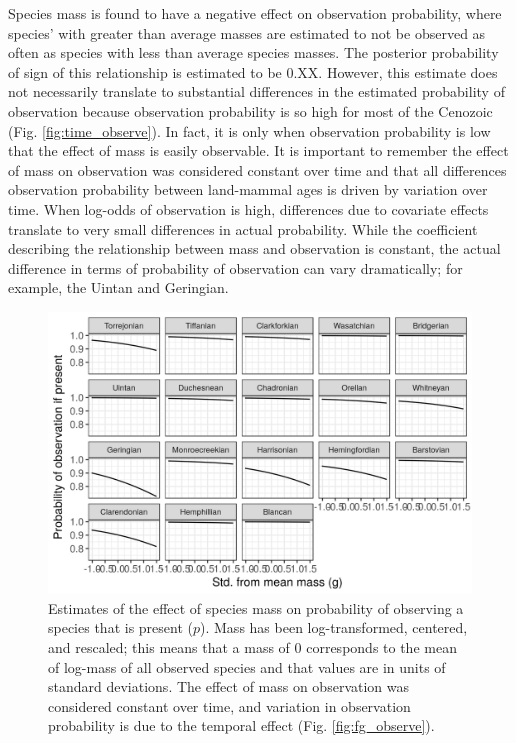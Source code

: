 \documentclass[12pt,letterpaper]{article}
\begin{document}
Species mass is found to have a negative effect on observation probability, where species' with greater than average masses are estimated to not be observed as often as species with less than average species masses. The posterior probability of sign of this relationship is estimated to be 0.XX. However, this estimate does not necessarily translate to substantial differences in the estimated probability of observation because observation probability is so high for most of the Cenozoic (Fig. \ref{fig:time_observe}). In fact, it is only when observation probability is low that the effect of mass is easily observable. It is important to remember the effect of mass on observation was considered constant over time and that all differences observation probability between land-mammal ages is driven by variation over time. When log-odds of observation is high, differences due to covariate effects translate to very small differences in actual probability. While the coefficient describing the relationship between mass and observation is constant, the actual difference in terms of probability of observation can vary dramatically; for example, the Uintan and Geringian. 
\begin{figure}[ht]
  \centering
  \includegraphics[width=\textwidth,height=0.4\textheight,keepaspectratio=true]{figure/mass_on_pres_bd}
  \caption[Estimates of the effect of mass on observation probability]{Estimates of the effect of species mass on probability of observing a species that is present (\(p\)). Mass has been log-transformed, centered, and rescaled; this means that a mass of 0 corresponds to the mean of log-mass of all observed species and that values are in units of standard deviations. The effect of mass on observation was considered constant over time, and variation in observation probability is due to the temporal effect (Fig. \ref{fig:fg_observe}).} 
  \label{fig:mass_observe}
\end{figure}
\end{document}
